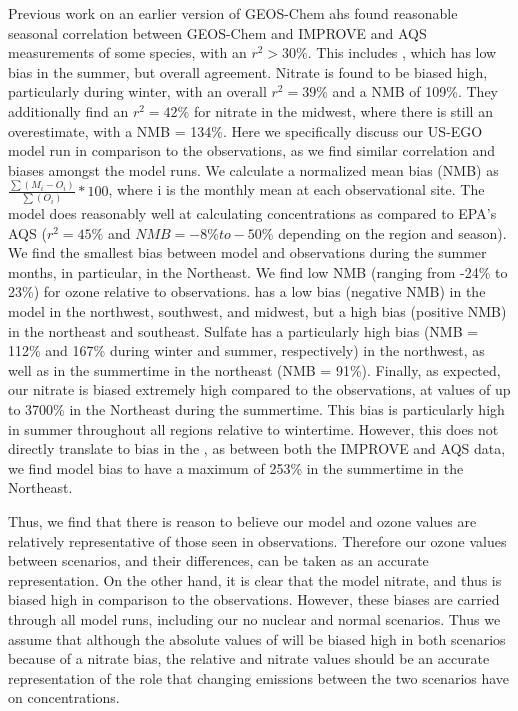 \documentclass[12]{article}
\begin{document}
Previous work \citep{holt_changes_2015} on an earlier version of GEOS-Chem ahs found reasonable seasonal correlation between GEOS-Chem and IMPROVE and AQS measurements of some species, with an $r^2 > 30\%$. This includes , which has low bias in the summer, but overall agreement. Nitrate is found to be biased high, particularly during winter, with an overall $r^2 = 39\%$ and a NMB of 109\%. They additionally find an $r^2 = 42\%$ for nitrate in the midwest, where there is still an overestimate, with a NMB = 134\%. Here we specifically discuss our US-EGO model run in comparison to the observations, as we find similar correlation and biases amongst the model runs. We calculate a normalized mean bias (NMB) as $\frac{\sum(M_i - O_i)}{\sum(O_i)}*100$, where i is the monthly mean at each observational site. The model does reasonably well at calculating  concentrations as compared to EPA's AQS ($r^2 = 45\%$ and $NMB = -8\% to -50\%$ depending on the region and season). We find the smallest bias between model  and observations during the summer months, in particular, in the Northeast.
We find low NMB (ranging from -24\% to 23\%) for ozone relative to observations.  has a low bias (negative NMB) in the model in the northwest, southwest, and midwest, but a high bias (positive NMB) in the northeast and southeast. Sulfate has a particularly high bias (NMB = 112\% and 167\% during winter and summer, respectively) in the northwest, as well as in the summertime in the northeast (NMB = 91\%). Finally, as expected, our nitrate is biased extremely high compared to the observations, at values of up to 3700\% in the Northeast during the summertime. This bias is particularly high in summer throughout all regions relative to wintertime. However, this does not directly translate to bias in the , as between both the IMPROVE and AQS data, we find model bias to have a maximum of 253\% in the summertime in the Northeast. 

Thus, we find that there is reason to believe our model  and ozone values are relatively representative of those seen in observations. Therefore our ozone values between scenarios, and their differences, can be taken as an accurate representation. On the other hand, it is clear that the model nitrate, and thus  is biased high in comparison to the observations. However, these biases are carried through all model runs, including our no nuclear and normal scenarios. Thus we assume that although the absolute values of  will be biased high in both scenarios because of a nitrate bias, the relative  and nitrate values should be an accurate representation of the role that changing emissions between the two scenarios have on  concentrations.
\end{document}
